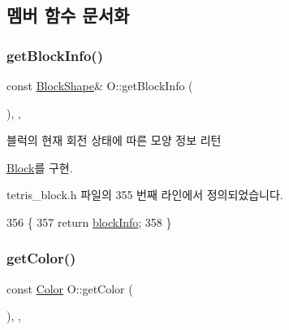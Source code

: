 \subsection{멤버 함수 문서화}
\mbox{\label{class_o_a608161f6603f07da95a9d26ac7f0cacb}} 
\subsubsection{\texorpdfstring{get\+Block\+Info()}{getBlockInfo()}}
{\footnotesize\ttfamily const \mbox{\hyperlink{class_block_aca5d951639f113e2ebd7856209d6b9ab}{Block\+Shape}}\& O\+::get\+Block\+Info (\begin{DoxyParamCaption}{ }\end{DoxyParamCaption})\hspace{0.3cm}{\ttfamily [inline]}, {\ttfamily [override]}, {\ttfamily [virtual]}}



블럭의 현재 회전 상태에 따른 모양 정보 리턴 



\mbox{\hyperlink{class_block_a2cdc0af223d621add42ac6c37fede329}{Block}}를 구현.



tetris\+\_\+block.\+h 파일의 355 번째 라인에서 정의되었습니다.


\begin{DoxyCode}
356     \{
357         \textcolor{keywordflow}{return} \mbox{\hyperlink{class_o_aff83495bf15903121bea8f8c5d7f2a11}{blockInfo}};
358     \}
\end{DoxyCode}
\mbox{\label{class_o_a2ffa14a52f6fa0f6964f25f75e2909ad}} 
\subsubsection{\texorpdfstring{get\+Color()}{getColor()}}
{\footnotesize\ttfamily const \mbox{\hyperlink{class_block_ad054b4ac51df79aa910040b2a2fdf7b5}{Color}} O\+::get\+Color (\begin{DoxyParamCaption}{ }\end{DoxyParamCaption})\hspace{0.3cm}{\ttfamily [inline]}, {\ttfamily [override]}, {\ttfamily [virtual]}}



